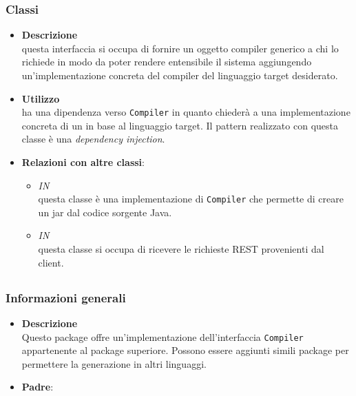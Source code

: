 \subsubsection{Classi}
\label{\nogloxy{swedesigner::server::compiler::Compiler}}
\begin{itemize}
\item \textbf{Descrizione}\\
questa interfaccia si occupa di fornire un oggetto compiler generico a chi lo richiede in modo da poter rendere entensibile il sistema aggiungendo un'implementazione concreta del compiler del linguaggio target desiderato.
\item \textbf{Utilizzo}\\
 ha una dipendenza verso \texttt{Compiler} in quanto chiederà a  una implementazione concreta di un  in base al linguaggio target. Il pattern realizzato con questa classe è una \emph{dependency injection}.
\item \textbf{Relazioni con altre classi}:
\begin{itemize}
\item \textit{IN} \hyperref[\nogloxy{swedesigner::server::compiler::java::JavaCompiler}]{}\\
questa classe è una implementazione di \texttt{Compiler} che permette di creare un jar dal codice sorgente Java.
\item \textit{IN} \hyperref[\nogloxy{swedesigner::server::controller::RequestHandlerController}]{}\\
questa classe si occupa di ricevere le richieste REST provenienti dal client.
\end{itemize}
\end{itemize}
\subsection{}
\label{\nogloxy{swedesigner::server::compiler::java}}
\subsubsection{Informazioni generali}
\begin{itemize}
\item \textbf{Descrizione}\\
Questo package offre un'implementazione dell'interfaccia \texttt{Compiler} appartenente al package superiore. Possono essere aggiunti simili package per permettere la generazione in altri linguaggi.
\item \textbf{Padre}: \hyperref[\nogloxy{swedesigner::server::compiler}]{}
\end{itemize}
